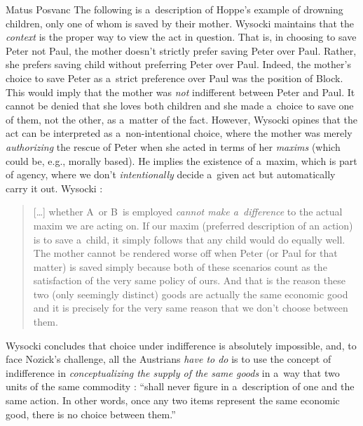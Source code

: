 \begin{artengenv}{Matus Posvanc}
The following is a~description of Hoppe's example of drowning children, only one of whom is saved by their mother. Wysocki maintains that the \textit{context} is the proper way to view the act in question. That is, in choosing to save Peter not Paul, the mother doesn't strictly prefer saving Peter over Paul. Rather, she prefers saving child without preferring Peter over Paul. Indeed, the mother's choice to save Peter as a~strict preference over Paul was the position of Block. This would imply that the mother was \textit{not} indifferent between Peter and Paul. It cannot be denied that she loves both children and she made a~choice to save one of them, not the other, as a~matter of the fact. However, Wysocki opines that the act can be interpreted as a~non-intentional choice, where the mother was merely \textit{authorizing} the rescue of Peter when she acted in terms of her \textit{maxims} (which could be, e.g., morally based). He implies the existence of a~maxim, which is part of agency, where we don't \textit{intentionally} decide a~given act but automatically carry it out. Wysocki 
\parencite*[][emphasis his]{Wysocki2021problem}:%




\begin{quote}
[…] whether A~or B~is employed \textit{cannot make a~difference} to the actual maxim we are acting on. If our maxim (preferred description of an action) is to save a~child, it simply follows that any child would do equally well. The mother cannot be rendered worse off when Peter (or Paul for that matter) is saved simply because both of these scenarios count as the satisfaction of the very same policy of ours. And that is the reason these two (only seemingly distinct) goods are actually the same economic good and it is precisely for the very same reason that we don't choose between them.
\end{quote}



Wysocki concludes that choice under indifference is absolutely impossible, and, to face Nozick's challenge, all the Austrians \textit{have to do} is to use the concept of indifference in \textit{conceptualizing the supply of the same goods} in a~way that two units of the same commodity 
\parencite[][p.37]{Wysocki2021problem}: %
 ``shall never figure in a~description of one and the same action. In other words, once any two items represent the same economic good, there is no choice between them.''




\end{artengenv}
